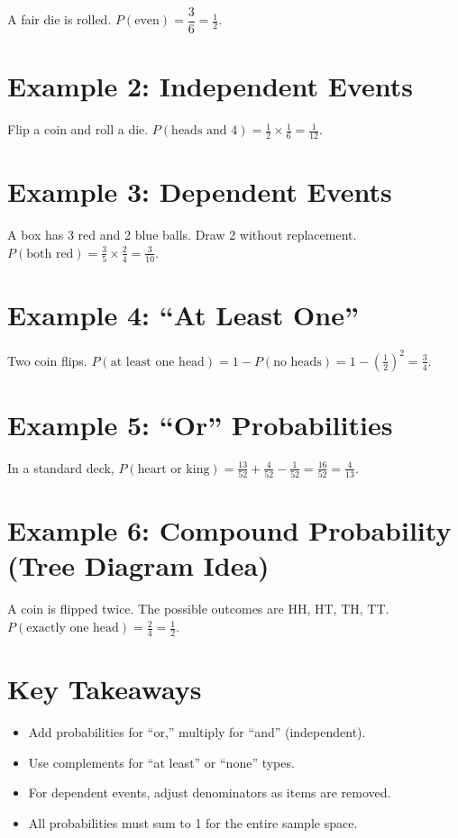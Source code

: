 \documentclass[14pt]{extarticle}
\begin{document}
A fair die is rolled.  
\(P(\text{even}) = \dfrac{3}{6} = \boxed{\tfrac{1}{2}}\).

\section*{Example 2: Independent Events}

Flip a coin and roll a die.  
\(P(\text{heads and 4}) = \tfrac{1}{2}\times\tfrac{1}{6}=\boxed{\tfrac{1}{12}}\).

\section*{Example 3: Dependent Events}

A box has 3 red and 2 blue balls. Draw 2 without replacement.  
\(P(\text{both red})=\tfrac{3}{5}\times\tfrac{2}{4}=\boxed{\tfrac{3}{10}}\).

\section*{Example 4: “At Least One”}

Two coin flips. \(P(\text{at least one head})=1-P(\text{no heads})=1-(\tfrac{1}{2})^2=\boxed{\tfrac{3}{4}}\).

\section*{Example 5: “Or” Probabilities}

In a standard deck, \(P(\text{heart or king})=\tfrac{13}{52}+\tfrac{4}{52}-\tfrac{1}{52}=\boxed{\tfrac{16}{52}=\tfrac{4}{13}}\).

\section*{Example 6: Compound Probability (Tree Diagram Idea)}

A coin is flipped twice. The possible outcomes are HH, HT, TH, TT.  
\(P(\text{exactly one head})=\tfrac{2}{4}=\boxed{\tfrac{1}{2}}\).

\section*{Key Takeaways}
\begin{itemize}
  \item Add probabilities for “or,” multiply for “and” (independent).
  \item Use complements for “at least” or “none” types.
  \item For dependent events, adjust denominators as items are removed.
  \item All probabilities must sum to 1 for the entire sample space.
\end{itemize}
\end{document}
